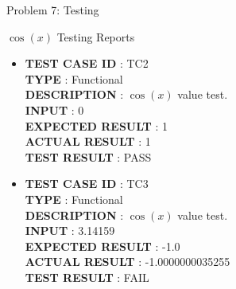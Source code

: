 \documentclass[a4paper,12pt]{article}
\begin{document}
\begin{section}{Problem 7: Testing}
\begin{subsubsection}{$\cos(x)$ Testing Reports}
\begin{itemize}
	\item \textbf{TEST CASE ID} \hspace{1.25cm} : TC2  \\
	\textbf{TYPE } \hspace{3.15cm}  : Functional\\
	\textbf{DESCRIPTION }\hspace{1.25cm} : $\cos(x)$ value test. \\
	\textbf{INPUT} \hspace{3.05cm} :  0 \\
	\textbf{EXPECTED RESULT} \hspace{0.01cm} : 1 \\
	\textbf{ACTUAL RESULT} \hspace{0.6cm} : 1 \\
	\textbf{TEST RESULT} \hspace{1.40cm} : PASS \\	
	
	\item \textbf{TEST CASE ID} \hspace{1.25cm} : TC3  \\
	\textbf{TYPE } \hspace{3.15cm}  : Functional\\
	\textbf{DESCRIPTION }\hspace{1.25cm} : $\cos(x)$ value test. \\
	\textbf{INPUT} \hspace{3.05cm} :  3.14159 \\
	\textbf{EXPECTED RESULT} \hspace{0.01cm} : -1.0 \\
	\textbf{ACTUAL RESULT} \hspace{0.6cm} : -1.0000000035255 \\
	\textbf{TEST RESULT} \hspace{1.40cm} : FAIL \\
\end{itemize}
\end{subsubsection}	
\vspace{1cm}	


\end{section}
\end{document}
